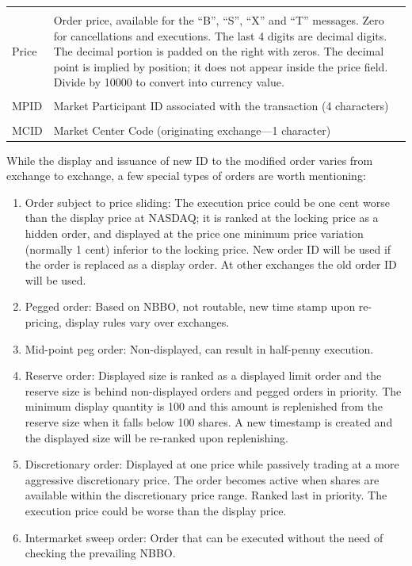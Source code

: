 \begin{table}[!ht]
\begin{tabular}{lp{}}
	& \\
	Price & Order price, available for the ``B'', ``S'', ``X'' and ``T'' messages. \newline Zero for cancellations and executions. The last 4 digits are decimal digits. The decimal portion is padded on the right with zeros. The decimal point is implied by position; it does not appear inside the price field. Divide by 10000 to convert into currency value. \\ 
	& \\
	MPID & Market Participant ID associated with the transaction (4 characters) \\
	& \\
	MCID & Market Center Code (originating exchange---1 character) 
	\end{tabular}
	\end{table}
	

While the display and issuance of new ID to the modified order varies from exchange to exchange, a few special types of orders are worth mentioning:
        \begin{enumerate}[1.]
        \item Order subject to price sliding: The execution price could be one cent worse than the display price at NASDAQ; it is ranked at the locking price as a hidden order, and displayed at the price one minimum price variation (normally 1 cent) inferior to the locking price. New order ID will be used if the order is replaced as a display order. At other exchanges the old order ID will be used.
        \item Pegged order: Based on NBBO, not routable, new time stamp upon re-pricing, display rules vary over exchanges.
        \item Mid-point peg order: Non-displayed, can result in half-penny execution.
        \item Reserve order: Displayed size is ranked as a displayed limit order and the reserve size is behind non-displayed orders and pegged orders in priority. The minimum display quantity is 100 and this amount is replenished from the reserve size when it falls below 100 shares. A new timestamp is created and the displayed size will be re-ranked upon replenishing.
        \item Discretionary order: Displayed at one price while passively trading at a more aggressive discretionary price. The order becomes active when shares are available within the discretionary price range. Ranked last in priority. The execution price could be worse than the display price.
        \item Intermarket sweep order: Order that can be executed without the need of checking the prevailing NBBO.  
        \end{enumerate}


